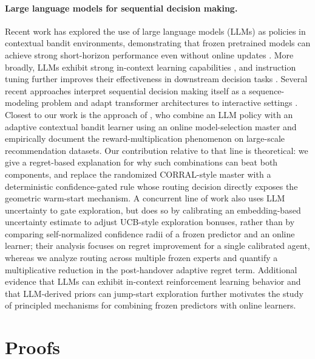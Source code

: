 \documentclass{article}
\theoremstyle{definition}
\theoremstyle{remark}
\theoremstyle{remark}
\begin{document}
\paragraph{Large language models for sequential decision making.}
Recent work has explored the use of large language models (LLMs) as policies
in contextual bandit environments, demonstrating that frozen pretrained
models can achieve strong short-horizon performance even without online
updates \cite{chen2024llmdecision}. More broadly, LLMs exhibit strong
in-context learning capabilities \cite{brown2020language,xie2021explanation,
garg2022can,akyurek2022learning}, and instruction tuning further improves
their effectiveness in downstream decision tasks
\cite{ouyang2022training,chung2024scaling}. Several recent approaches
interpret sequential decision making itself as a sequence-modeling problem
and adapt transformer architectures to interactive settings
\cite{chen2021decision,zheng2022online,reid2022can,sun2023smart,
raparthy2023generalization,lee2023supervised}.
Closest to our work is the approach of \cite{chen2024llmdecision}, who
combine an LLM policy with an adaptive contextual bandit learner using an
online model-selection master and empirically document the
reward-multiplication phenomenon on large-scale recommendation datasets.
Our contribution relative to that line is theoretical: we give a
regret-based explanation for why such combinations can beat both components,
and replace the randomized CORRAL-style master with a deterministic
confidence-gated rule whose routing decision directly exposes the geometric
warm-start mechanism. A concurrent line of work \cite{huangcontextual} also
uses LLM uncertainty to gate exploration, but does so by calibrating an
embedding-based uncertainty estimate to adjust UCB-style exploration
bonuses, rather than by comparing self-normalized confidence radii of a
frozen predictor and an online learner; their analysis focuses on regret
improvement for a single calibrated agent, whereas we analyze routing
across multiple frozen experts and quantify a multiplicative reduction in
the post-handover adaptive regret term. Additional evidence that LLMs can
exhibit in-context reinforcement learning behavior
\cite{monea2024llms,krishnamurthy2024can} and that LLM-derived priors can
jump-start exploration \cite{alamdari2024jumpstarting,abbasiyadkori2024believe}
further motivates the study of principled mechanisms for combining frozen
predictors with online learners.


\section{Proofs}
\label{app:proofs}
\end{document}
